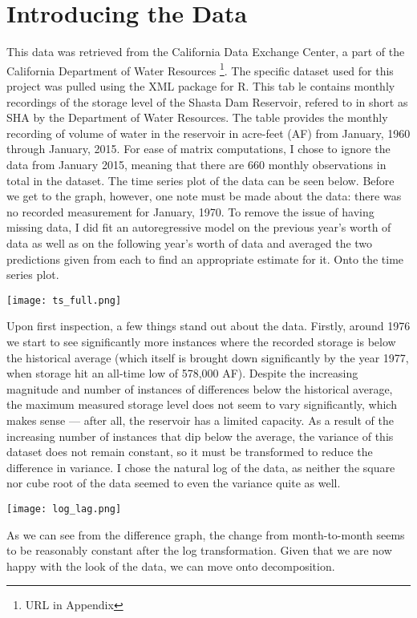 \documentclass[twoside,12pt]{article}
\begin{document}
\part{Introducing the Data}
This data was retrieved from the California Data Exchange Center, a part of the California Department of Water Resources \footnote{URL in Appendix}. The specific dataset used for this project was pulled using the XML package for R. This tab
le contains monthly recordings of the storage level of the Shasta Dam Reservoir, refered to in short as SHA by the Department of Water Resources. The table provides the monthly recording of volume of water in the reservoir in acre-feet (AF) from January, 1960 through January, 2015. For ease of matrix computations, I chose to ignore the data from January 2015, meaning that there are 660 monthly observations in total in the dataset. The time series plot of the data can be seen below. Before we get to the graph, however, one note must be made about the data: there was no recorded measurement for January, 1970. To remove the issue of having missing data, I did fit an autoregressive model on the previous year's worth of data as well as on the following year's worth of data and averaged the two predictions given from each to find an appropriate estimate for it. Onto the time series plot.\\
\begin{center}
\texttt{[image: ts\_full.png]}
\end{center}
Upon first inspection, a few things stand out about the data. Firstly, around 1976 we start to see significantly more instances where the recorded storage is below the historical average (which itself is brought down significantly by the year 1977, when storage hit an all-time low of 578,000 AF). Despite the increasing magnitude and number of instances of differences below the historical average, the maximum measured storage level does not seem to vary significantly, which makes sense --- after all, the reservoir has a limited capacity. As a result of the increasing number of instances that dip below the average, the variance of this dataset does not remain constant, so it must be transformed to reduce the difference in variance. I chose the natural log of the data, as neither the square nor cube root of the data seemed to even the variance quite as well.\\
\begin{center}
\texttt{[image: log\_lag.png]}
\end{center}
As we can see from the difference graph, the change from month-to-month seems to be reasonably constant after the log transformation. Given that we are now happy with the look of the data, we can move onto decomposition.\\
\end{document}
